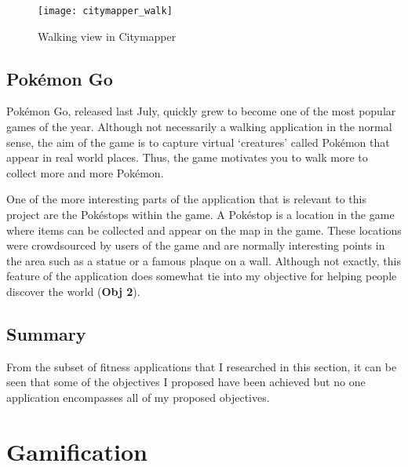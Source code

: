 \begin{figure}[hbt]
  \centering
  \texttt{[image: citymapper\_walk]}
  \caption{Walking view in Citymapper}
  \label{fig:citymapper-walk}
\end{figure}



\subsection{Pok\'{e}mon Go} \label{subsection:pokemongo}

Pok\'{e}mon Go, released last July, quickly grew to become one of the most popular games of the year. Although not necessarily a walking application in the normal sense, the aim of the game is to capture virtual `creatures' called Pok\'{e}mon that appear in real world places. Thus, the game motivates you to walk more to collect more and more Pok\'{e}mon.

One of the more interesting parts of the application that is relevant to this project are the Pok\'{e}stops within the game. A Pok\'{e}stop is a location in the game where items can be collected and appear on the map in the game. These locations were crowdsourced by users of the game and are normally interesting points in the area such as a statue or a famous plaque on a wall. Although not exactly, this feature of the application does somewhat tie into my objective for helping people discover the world (\textbf{Obj 2}).



\subsection{Summary}

From the subset of fitness applications that I researched in this section, it can be seen that some of the objectives I proposed have been achieved but no one application encompasses all of my proposed objectives.

\section{Gamification}



